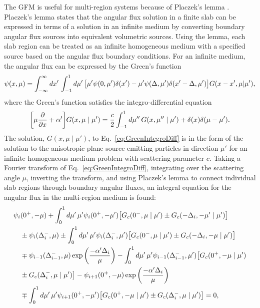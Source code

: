 The GFM is useful for multi-region systems because of Placzek's lemma \cite{case1953introduction}. Placzek's lemma states that the angular flux solution in a finite slab can be expressed in terms of a solution in an infinite medium by converting boundary angular flux sources into equivalent volumetric sources. Using the lemma, each slab region can be treated as an infinite homogeneous medium with a specified source based on the angular flux boundary conditions. For an infinite medium, the angular flux can be expressed by the Green's function
\begin{equation}
\psi(x,\mu) = \int_{-\infty}^{\infty} \mathop{}\!d x' \, \int_{-1}^{1} \mathop{}\!d \mu' \, \big [ \mu' \psi(0,\mu') \delta(x') - \mu' \psi(\Delta,\mu') \delta(x'-\Delta,\mu') \big]  G(x-x', \mu | \mu'),
\end{equation}
where the Green's function satisfies the integro-differential equation
\begin{equation}
	\bigg [ \mu \frac{\partial}{\partial x} + \alpha' \bigg ] G(x,\mu \mid \mu') = \frac{c}{2} \int_{-1}^{1} \mathop{}\!d \mu'' \, G(x,\mu'' \mid \mu') + \delta(x) \delta(\mu - \mu').
	\label{eq:GreenIntegroDiff}
\end{equation}
The solution, $G(x,\mu \mid \mu')$, to Eq.~\ref{eq:GreenIntegroDiff} is in the form of the solution to the anisotropic plane source emitting particles in direction $\mu'$ for an infinite homogeneous medium problem with scattering parameter $c$. Taking a Fourier transform of Eq.~\ref{eq:GreenIntegroDiff}, integrating over the scattering angle $\mu$, inverting the transform, and using Placzek's lemma to connect individual slab regions through boundary angular fluxes, an integral equation for the angular flux in the multi-region medium is found:
\begin{align}
\begin{split}
	\psi_{i}&(0^{+}, -\mu) + \int_{0}^{1} \mathop{}\!d \mu' \, \mu' \psi_{i}(0^{+}, - \mu') \big [ G_{c}(0^{-}, \mu \mid \mu') \pm G_{c}(-\Delta_{i}, -\mu' \mid \mu') \big ] \\
	&\pm \psi_{i}(\Delta_{i}^{-},\mu) \pm \int_{0}^{1} \mathop{}\!d \mu' \, \mu' \psi_{i}(\Delta_{i}^{-}, \mu') \big [ G_{c}(0^{-}, \mu \mid \mu') \pm G_{c}(-\Delta_{i}, -\mu \mid \mu') \big ] \\
	&\mp \psi_{i-1}(\Delta_{i-1}^{-}, \mu) \exp \bigg ( \frac{-\alpha' \Delta_{i}}{\mu} \bigg ) - \int_{0}^{1} \mathop{}\!d \mu' \, \mu' \psi_{i-1}(\Delta_{i-1}^{-}, \mu') \big [ G_{c}(0^{+}, -\mu \mid \mu') \\
	&\pm G_{c}(\Delta_{i}^{-}, \mu \mid \mu') \big ] - \psi_{i+1}(0^{+}, -\mu) \exp \bigg ( \frac{-\alpha' \Delta_{i}}{\mu} \bigg ) \\
	&\mp \int_{0}^{1} \mathop{}\!d \mu' \, \mu' \psi_{i+1}(0^{+}, -\mu') \big [ G_{c}(0^{+}, -\mu \mid \mu') \pm G_{c}(\Delta_{i}^{-}, \mu \mid \mu') \big ] = 0,
\end{split}
\label{eq:GFMBC}
\end{align}
